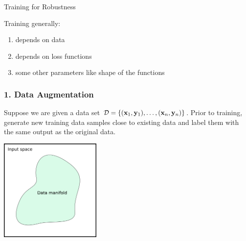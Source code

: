 \documentclass[aspectratio=169]{beamer}
\begin{document}
\begin{frame}
  \frametitle{}



  \begin{block}{ Training for Robustness}

    \end{block}

    \pause
    Training generally:

    \begin{enumerate}
    \item depends on data
    \item depends on loss functions
      \item some other parameters like shape of the functions
      \end{enumerate}
    
\end{frame}





\begin{frame}[fragile]
  \frametitle{1. Data Augmentation}
  Suppose we are given a data set $\mathcal{D} =  \{(\mathbf{x}_1, \mathbf{y}_1), \ldots , (\mathbf{x}_n, \mathbf{y}_n)\}$.
  Prior to training, generate new training data samples close to existing data and label them with the same output as the original data.
      {\scriptsize
 \begin{thebibliography}{99}
   \beamertemplatearticlebibitems
\end{thebibliography}}

\pause

\begin{center}

  \includegraphics[width=5cm]{Images/SR-vs-CR-1.png}

  \end{center}
  
\end{frame}
\end{document}
